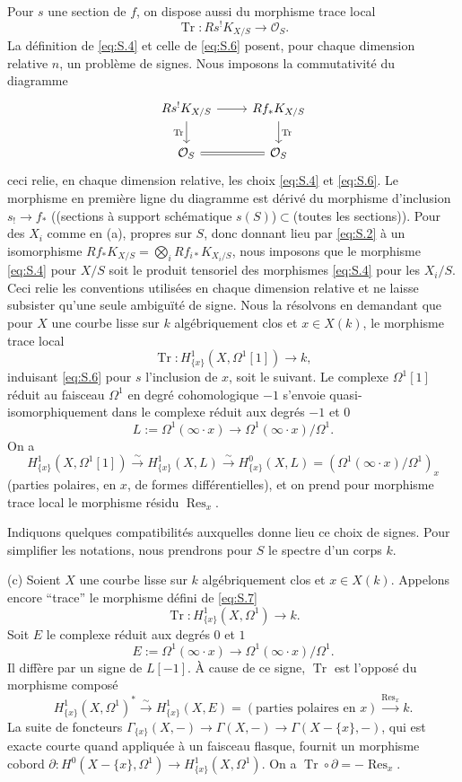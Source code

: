\documentclass[12pt,a4paper]{article}
\theoremstyle{plain}
\theoremstyle{definition}
\theoremstyle{remark}
\DeclareMathOperator{\Res}{Res}
\DeclareMathOperator{\Tr}{Tr}
\newcommand{\OO}{\mathcal{O}}
\providecommand{\Tr}{\operatorname{Tr}}
\begin{document}
Pour $s$ une section de $f$, on dispose aussi du morphisme trace local
\begin{equation}\label{eq:S.6}
\Tr:Rs^!K_{X/S}\to\OO_S.
\end{equation}
La définition de \eqref{eq:S.4} et celle de \eqref{eq:S.6} posent, pour chaque dimension
relative $n$, un problème de signes. Nous imposons la commutativité du diagramme
\[
\begin{tikzcd}
Rs^!K_{X/S} \ar[r] \ar[d,"\Tr"'] & Rf_*K_{X/S} \ar[d,"\Tr"] \\
\OO_S \ar[r,equal] & \OO_S
\end{tikzcd}
\]
ceci relie, en chaque dimension relative, les choix \eqref{eq:S.4} et \eqref{eq:S.6}.
Le morphisme en première ligne du diagramme est dérivé du morphisme
d'inclusion $s_!\to f_*$ ((sections à support schématique $s(S)$)$\subset$(toutes les
sections)). Pour des $X_i$ comme en (a), propres sur $S$, donc donnant lieu par
\eqref{eq:S.2} à un isomorphisme $Rf_*K_{X/S}=\bigotimes_i Rf_{i*}K_{X_i/S}$, nous imposons
que le morphisme \eqref{eq:S.4} pour $X/S$ soit le produit tensoriel des morphismes
\eqref{eq:S.4} pour les $X_i/S$. Ceci relie les conventions utilisées en chaque dimension
relative et ne laisse subsister qu'une seule ambiguïté de signe. Nous la résolvons en
demandant que pour $X$ une courbe lisse sur $k$ algébriquement clos et $x\in X(k)$,
le morphisme trace local
\begin{equation}\label{eq:S.7}
\Tr:H^1_{\{x\}}(X,\Omega^1[1])\to k,
\end{equation}
induisant \eqref{eq:S.6} pour $s$ l'inclusion de $x$, soit le suivant. Le complexe
$\Omega^1[1]$ réduit au faisceau $\Omega^1$ en degré cohomologique $-1$ s'envoie quasi-
isomorphiquement dans le complexe réduit aux degrés $-1$ et $0$
\[
L:=\Omega^1(\infty\cdot x)\to\Omega^1(\infty\cdot x)/\Omega^1.
\]
On a
\[
H^1_{\{x\}}(X,\Omega^1[1])\xrightarrow{\sim} H^1_{\{x\}}(X,L)\xrightarrow{\sim} H^0_{\{x\}}(X,L)=(\Omega^1(\infty\cdot x)/\Omega^1)_x
\]
(parties polaires, en $x$, de formes différentielles), et on prend pour morphisme
trace local le morphisme résidu $\Res_x$.

Indiquons quelques compatibilités auxquelles donne lieu ce choix de signes.
Pour simplifier les notations, nous prendrons pour $S$ le spectre d'un corps $k$.

(c) Soient $X$ une courbe lisse sur $k$ algébriquement clos et $x\in X(k)$. Appelons
encore ``trace'' le morphisme défini de \eqref{eq:S.7}
\[
\Tr:H^1_{\{x\}}(X,\Omega^1)\to k.
\]
Soit $E$ le complexe réduit aux degrés $0$ et $1$
\[
E:=\Omega^1(\infty\cdot x)\to\Omega^1(\infty\cdot x)/\Omega^1.
\]
Il diffère par un signe de $L[-1]$. À cause de ce signe, $\Tr$ est l'opposé du morphisme composé
\[
H^1_{\{x\}}(X,\Omega^1)^*\xrightarrow{\sim} H^1_{\{x\}}(X,E)=(\text{parties polaires en }x)\xrightarrow{\Res_x}k.
\]
La suite de foncteurs
$\Gamma_{\{x\}}(X,-)\to\Gamma(X,-)\to\Gamma(X-\{x\},-)$, qui est exacte courte quand
appliquée à un faisceau flasque, fournit un morphisme cobord
$\partial:H^0(X-\{x\},\Omega^1)\to H^1_{\{x\}}(X,\Omega^1)$. On a $\Tr\circ\partial=-\Res_x$.
\end{document}
